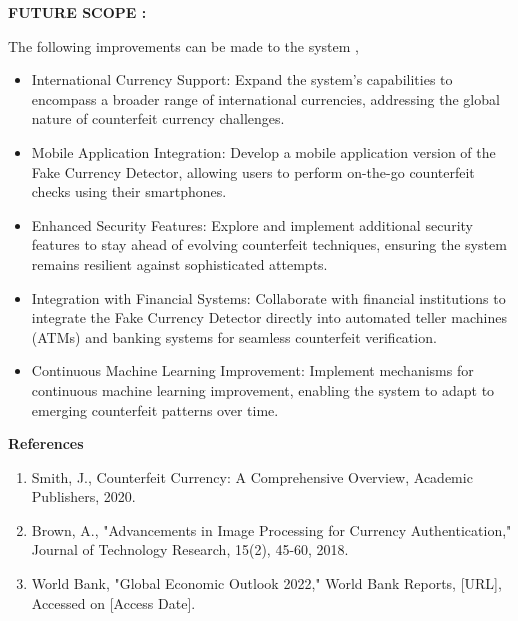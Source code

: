 \documentclass[12pt]{article}
\begin{document}
 \large \textbf{FUTURE SCOPE :}\\[3mm]\par
The following improvements can be made to the system ,
\begin{itemize}
\item International Currency Support:
Expand the system's capabilities to encompass a broader range of international currencies, addressing the global nature of counterfeit currency challenges.
\item Mobile Application Integration:
Develop a mobile application version of the Fake Currency Detector, allowing users to perform on-the-go counterfeit checks using their smartphones.
\item Enhanced Security Features:
Explore and implement additional security features to stay ahead of evolving counterfeit techniques, ensuring the system remains resilient against sophisticated attempts.
\item Integration with Financial Systems:
Collaborate with financial institutions to integrate the Fake Currency Detector directly into automated teller machines (ATMs) and banking systems for seamless counterfeit verification.
\item Continuous Machine Learning Improvement:
Implement mechanisms for continuous machine learning improvement, enabling the system to adapt to emerging counterfeit patterns over time.
\end{itemize}
 

 
\clearpage


\LARGE \textbf{References }\\[5mm]

\begin{enumerate}
\item Smith, J., Counterfeit Currency: A Comprehensive Overview, Academic Publishers, 2020.
\item Brown, A., "Advancements in Image Processing for Currency Authentication," Journal of Technology Research, 15(2), 45-60, 2018.
\item World Bank, "Global Economic Outlook 2022," World Bank Reports, [URL], Accessed on [Access Date].

\clearpage

\end{enumerate}


 
\end{document}
